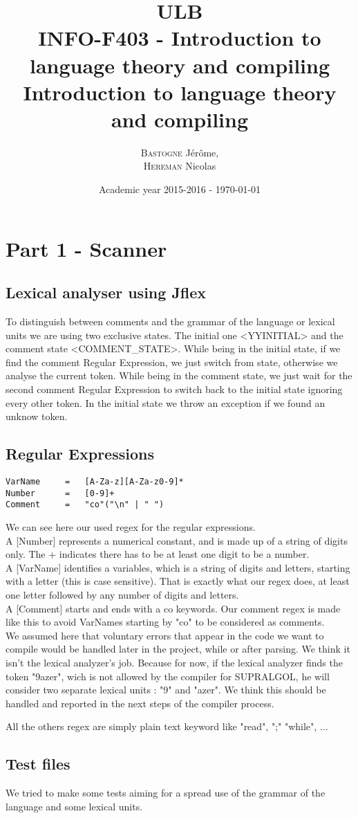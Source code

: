 \documentclass[a4paper,10pt]{report}
\title{ULB\\
        INFO-F403 - Introduction to language theory and compiling \\
            Introduction to language theory and compiling}
\author{\textsc{Bastogne} Jérôme,\\
        \textsc{Hereman} Nicolas}
\date{Academic year 2015-2016 - \today}
\begin{document}
\maketitle
\clearpage


\chapter{Part 1 - Scanner}

\section{Lexical analyser using Jflex}

To distinguish between comments and the grammar of the language or lexical units we are using two exclusive states. The initial one <YYINITIAL> and the comment state <COMMENT\_STATE>. While being in the initial state, if we find the comment Regular Expression, we just switch from state, otherwise we analyse the current token. While being in the comment state, we just wait for the second comment Regular Expression to switch back to the initial state ignoring every other token. In the initial state we throw an exception if we found an unknow token.

\section{Regular Expressions}

\begin{lstlisting}
VarName		=	[A-Za-z][A-Za-z0-9]*
Number		=	[0-9]+
Comment		=	"co"("\n" | " ")
\end{lstlisting}
We can see here our used regex for the regular expressions.\\
A [Number] represents a numerical constant, and is made up of a string of digits only. The + indicates there has to be at least one digit to be a number.\\
A [VarName] identifies a variables, which is a string of digits and letters, starting with a letter (this is case sensitive). That is exactly what our regex does, at least one letter followed by any number of digits and letters.\\
A [Comment] starts and ends with a co keywords. Our comment regex is made like this to avoid VarNames starting by "co" to be considered as comments.\\
We assumed here that voluntary errors that appear in the code we want to compile would be handled later in the project, while or after parsing. We think it isn't the lexical analyzer's job. Because for now, if the lexical analyzer finds the token "9azer", wich is not allowed by the compiler for SUPRALGOL, he will consider two separate lexical units : "9" and "azer". We think this should be handled and reported in the next steps of the compiler process.

All the others regex are simply plain text keyword like "read", ";" "while", ...



\section{Test files}

We tried to make some tests aiming for a spread use of the grammar of the language and some lexical units.
\end{document}
